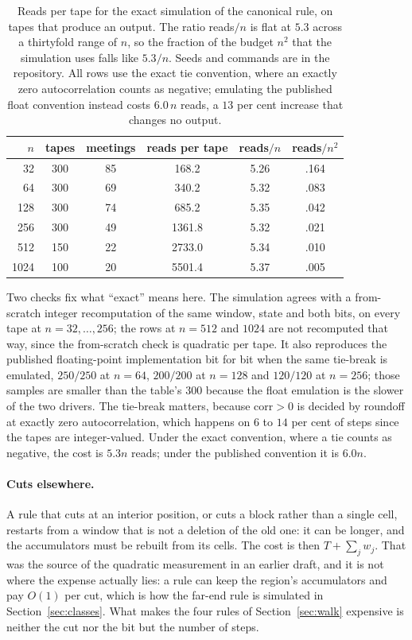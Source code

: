 \documentclass[11pt]{article}
\begin{document}
\begin{table}[h]
\centering
\small
\begin{tabular}{rccccc}
\toprule
$n$ & tapes & meetings & reads per tape & reads$/n$ & reads$/n^2$ \\
\midrule
32   & 300 & 85 & 168.2   & 5.26 & .164 \\
64   & 300 & 69 & 340.2   & 5.32 & .083 \\
128  & 300 & 74 & 685.2   & 5.35 & .042 \\
256  & 300 & 49 & 1361.8  & 5.32 & .021 \\
512  & 150 & 22 & 2733.0  & 5.34 & .010 \\
1024 & 100 & 20 & 5501.4  & 5.37 & .005 \\
\bottomrule
\end{tabular}
\caption{Reads per tape for the exact simulation of the canonical rule, on tapes that produce an
output. The ratio reads$/n$ is flat at $5.3$ across a thirtyfold range of $n$, so the fraction of the
budget $n^2$ that the simulation uses falls like $5.3/n$. Seeds and commands
are in the repository. All rows use the exact tie convention,
where an exactly zero autocorrelation counts as negative; emulating the published float convention instead
costs $6.0\,n$ reads, a $13$ per cent increase that changes no output.}
\label{tab:sim}
\end{table}

Two checks fix what ``exact'' means here. The simulation agrees with a from-scratch integer
recomputation of the same window, state and both bits, on every tape at $n=32,\dots,256$; the rows at
$n=512$ and $1024$ are not recomputed that way, since the from-scratch check is quadratic per tape.
It also reproduces the published floating-point implementation bit for bit when the same tie-break
is emulated, $250/250$ at $n=64$, $200/200$ at $n=128$ and $120/120$ at $n=256$; those samples are
smaller than the table's $300$ because the float emulation is the slower of the two drivers. The tie-break matters,
because $\mathrm{corr}>0$ is decided by roundoff at exactly zero autocorrelation, which happens on
$6$ to $14$ per cent of steps since the tapes are integer-valued. Under the exact convention, where a
tie counts as negative, the cost is $5.3n$ reads; under the published convention it is $6.0n$.

\paragraph{Cuts elsewhere.} A rule that cuts at an interior position, or cuts a block rather than a
single cell, restarts from a window that is not a deletion of the old one: it can be longer, and the
accumulators must be rebuilt from its cells. The cost is then $T+\sum_j w_j$. That was the source of
the quadratic measurement in an earlier draft, and it is not where the expense actually lies: a rule
can keep the region's accumulators and pay $O(1)$ per cut, which is how the far-end rule is simulated
in Section~\ref{sec:classes}. What makes the four rules of Section~\ref{sec:walk} expensive is
neither the cut nor the bit but the number of steps.
\end{document}
